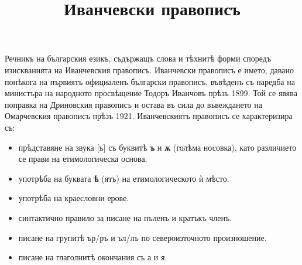 \documentclass{article}
\begin{document}
	\title{Иванчевски правописъ}
	\maketitle
	
	Речникъ на българския езикъ, съдържащъ слова и тѣхнитѣ форми споредъ изискванията на Иванчевския правописъ. 
	Иванчевски правописъ е името, давано понѣкога на първиятъ официаленъ български правописъ, 
	въвѣденъ съ наредба на министъра на народното просвѣщение Тодоръ Иванчовъ прѣзъ 1899.
	Той се явява поправка на Дриновския правописъ и остава въ сила до въвеждането на Омарчевския правописъ прѣзъ 1921. 
	Иванчевскиятъ правописъ се характеризира съ:
	\begin{itemize}
		\item прѣдставяне на звука [ъ] съ буквитѣ \textbf{ъ} и \textbf{ѫ} (голѣма носовка), като различието се прави на етимологическа основа. 
		\item употрѣба на буквата \textbf{ѣ} (ятъ) на етимологическото ѝ мѣсто.
		\item употрѣба на краесловни ерове.
		\item синтактично правило за писане на пъленъ и кратъкъ членъ.
		\item писане на групитѣ ър/ръ и ъл/лъ по североизточното произношение.
		\item писане на глаголнитѣ окончания съ а и я.
	\end{itemize}
	
%	
%		
%		
%		
	
\end{document}
